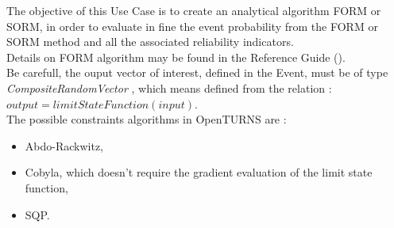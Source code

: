 \renewcommand{\filename}{docUC_ThresholdExceedance_FORMAlgorithm.tex}
\renewcommand{\filetitle}{UC : Creation of an analytical algorithm : FORM/SORM}

\HeaderIIILevel

\label{analyticalRes}



The objective of this Use Case is to create an analytical algorithm FORM or SORM, in order to evaluate in fine the event probability from the FORM or SORM  method and all the associated reliability indicators.\\




Details on FORM algorithm may be found in the Reference Guide ().\\



Be carefull, the ouput vector of interest, defined in the Event, must be of type {\itshape CompositeRandomVector }, which means defined from the relation : $output = limitStateFunction(input)$.\\

The possible constraints algorithms  in OpenTURNS are :
\begin{itemize}
\item Abdo-Rackwitz,
\item Cobyla, which doesn't require the gradient evaluation of the limit state function,
\item SQP.
\end{itemize}


